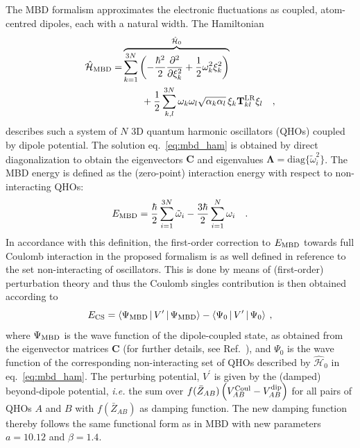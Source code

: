\documentclass[aps,prl,groupaddress, twocolumn]{revtex4-1}  %
\begin{document}
The MBD formalism approximates the electronic fluctuations as coupled, atom-centred dipoles, each with a natural width. The Hamiltonian
\begin{equation}\label{eq:mbd_ham}
\begin{split}
\hat{\mathcal{H}}_{\mathrm{MBD}} = &\overbrace{\sum_{k=1}^{3N} \left( -\frac{\hbar^2}{2}\frac{\partial^2}{\partial \xi_{k}^2} + \frac{1}{2}\omega_k^2  \xi_k^2\right) }^{\hat{\mathcal{H}}_0}\\
& \qquad + \frac{1}{2}\sum_{k,l}^{3N} \omega_k\omega_l\sqrt{\alpha_k \alpha_l}\,\xi_k \mathbf{T}_{kl}^{\rm LR} \xi_l \quad,
\end{split}
\end{equation}
describes such a system of $N$ 3D quantum harmonic oscillators (QHOs) coupled by dipole potential. The solution eq.~\eqref{eq:mbd_ham} is obtained by direct diagonalization to obtain the eigenvectors $\mathbf{C}$ and eigenvalues $\mathbf{\Lambda} = \mathrm{diag}\{\tilde{\omega}_i^2\}$. The MBD energy is defined as the (zero-point) interaction energy with respect to non-interacting QHOs:
 \begin{eqnarray}
 E_{\rm MBD}
=\frac{\hbar}{2}\sum_{i=1}^{3N}\tilde{\omega}_i - \frac{3\hbar}{2}\sum_{i=1}^{N}\omega_i \quad . \label{eq:mbd_en}
 \end{eqnarray}
 In accordance with this definition, the first-order correction to $E_{\rm MBD}$ towards full Coulomb interaction in the proposed formalism is as well defined in reference to the set non-interacting of oscillators. This is done by means of (first-order) perturbation theory and thus the Coulomb singles contribution is then obtained according to
 \begin{equation}\label{foc_energy_damp}
E_{\rm CS} = \Braket{\Psi_{\rm MBD} | V^\prime | \Psi_{\rm MBD}} - \Braket{\Psi_0 | V^\prime | \Psi_0} \:,
\end{equation}
where $\Psi_{\rm MBD}$ is the wave function of the dipole-coupled state, as obtained from the eigenvector matrices $\mathbf{C}$ (for further details, see Ref.~\cite{hermann_ncomm2017}), and $\Psi_0$ is the wave function of the corresponding non-interacting set of QHOs described by $\hat{\mathcal{H}}_0$ in eq.~\eqref{eq:mbd_ham}. The perturbing potential, $V^\prime$ is given by the (damped) beyond-dipole potential, \textit{i.e.} the sum over $f(\bar{Z}_{AB})\left(V_{AB}^{\rm Coul}-V_{AB}^{\rm dip}\right)$ for all pairs of QHOs $A$ and $B$ with $f(\bar{Z}_{AB})$ as damping function. The new damping function thereby follows the same functional form as in MBD with new parameters $a=10.12$ and $\beta=1.4$.
\end{document}
